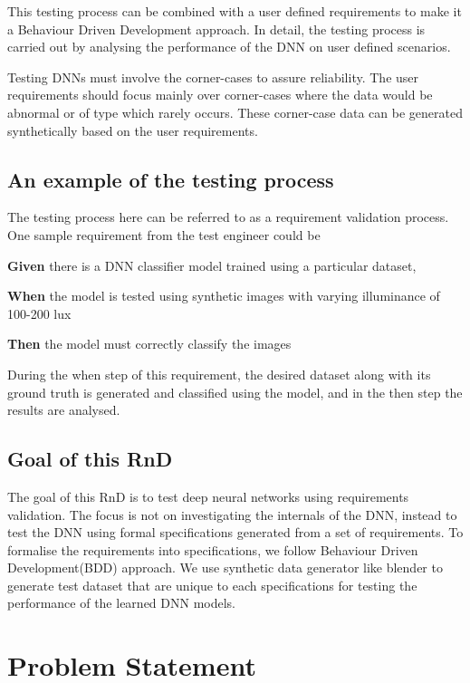 \documentclass[rnd]{mas_proposal}
\begin{document}
This testing process can be combined with a user defined requirements to make it a Behaviour Driven Development approach. In detail, the testing process is carried out by analysing the performance of the DNN on user defined scenarios.

Testing DNNs must involve the corner-cases to assure reliability\cite{CornerCase}. The user requirements should focus mainly over corner-cases where the data would be abnormal or of type which rarely occurs. These corner-case data can be generated synthetically based on the user requirements.
    
    
\subsection{An example of the testing process}
    
The testing process here can be referred to as a requirement validation process. One sample requirement from the test engineer could be

\quad \textbf{Given} there is a DNN classifier model trained using a particular dataset,

\quad \textbf{When} the model is tested using synthetic images with varying illuminance of 100-200 lux

\quad \textbf{Then} the model must correctly classify the images

During the when step of this requirement, the desired dataset along with its ground truth is generated and classified using the model, and in the then step the results are analysed.

\subsection{Goal of this RnD}
    
The goal of this RnD is to test deep neural networks using requirements validation. The focus is not on investigating the internals of the DNN, instead to test the DNN using formal specifications generated from a set of requirements. To formalise the requirements into specifications, we follow Behaviour Driven Development(BDD) approach. We use synthetic data generator like blender to generate test dataset that are unique to each specifications for testing the performance of the learned DNN models.

\section{Problem Statement}
\end{document}
